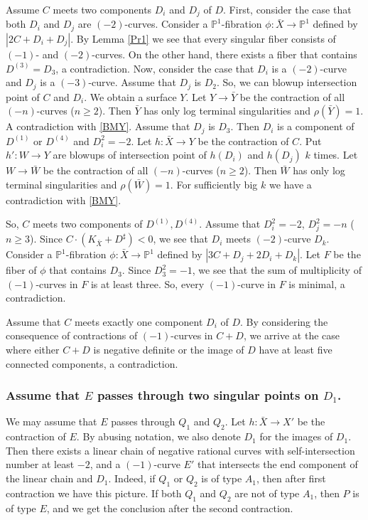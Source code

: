 \documentclass[10pt,oneside,reqno]{amsart}
\newcommand{\pp}{\mathbb{P}}
\theoremstyle{definition}
\theoremstyle{remark}
\numberwithin{equation}{section}
\begin{document}
Assume $C$ meets two components $D_i$ and $D_j$ of $D$. First, consider the case that both $D_i$ and $D_j$ are $(-2)$-curves. Consider a $\pp^1$-fibration $\phi\colon\bar{X}\rightarrow\pp^1$ defined by $|2C+D_i+D_j|$. By Lemma \ref{Pr1} we see that every singular fiber consists of $(-1)$- and $(-2)$-curves. On the other hand, there exists a fiber that contains $D^{(3)}=D_3$, a contradiction. Now, consider the case that $D_i$ is a $(-2)$-curve and $D_j$ is a $(-3)$-curve. Assume that $D_j$ is $D_2$. So, we can blowup intersection point of $C$ and $D_i$. We obtain a surface $Y$. Let $Y\rightarrow\bar{Y}$ be the contraction of all $(-n)$-curves ($n\geq 2$). Then $\bar{Y}$ has only log terminal singularities and $\rho(\bar{Y})=1$. A contradiction with \ref{BMY}. Assume that $D_j$ is $D_3$. Then $D_i$ is a component of $D^{(1)}$ or $D^{(4)}$ and $D_i^2=-2$. Let $h\colon\bar {X}\rightarrow Y$ be the contraction of $C$. Put $h'\colon W\rightarrow Y$ are blowups of intersection point of $h(D_i)$ and $h(D_j)$ $k$ times. Let $W\rightarrow\bar{W}$ be the contraction of all $(-n)$-curves ($n\geq 2$). Then $\bar{W}$ has only log terminal singularities and $\rho(\bar{W})=1$. For sufficiently big $k$ we have a contradiction with \ref{BMY}.



So, $C$ meets two components of $D^{(1)},D^{(4)}$. Assume that $D_i^2=-2$, $D_j^2=-n$ ($n\geq 3$). Since $C\cdot (K_{\bar{X}}+D^{\sharp})<0$, we see that $D_i$ meets $(-2)$-curve $D_k$.
Consider a $\pp^1$-fibration $\phi\colon\bar{X}\rightarrow\pp^1$ defined by $|3C+D_j+2D_i+D_k|$. Let $F$ be the fiber of $\phi$ that contains $D_3$. Since $D_3^2=-1$, we see that the sum of multiplicity of $(-1)$-curves in $F$ is at least three. So, every $(-1)$-curve in $F$ is minimal, a contradiction.

Assume that $C$ meets exactly one component $D_i$ of $D$. By considering the consequence of contractions of $(-1)$-curves in $C+D$, we arrive at the case where either $C+D$ is negative definite or the image of $D$ have at least five connected components, a contradiction.


\subsubsection{Assume that $E$ passes through two singular points on $D_1$.} We may assume that $E$ passes through $Q_1$ and $Q_2$. %
Let $h\colon\bar{X}\rightarrow X'$ be the contraction of $E$. By abusing notation, we also denote $D_1$  for the images of $D_1$. Then there exists a linear chain of negative rational curves with self-intersection number at least $-2$, and a $(-1)$-curve $E'$ that intersects the end component of the linear chain and $D_1$. Indeed, if $Q_1$ or $Q_2$ is of type $A_1$, then after first contraction we have this picture. If both $Q_1$ and $Q_2$ are not of type $A_1$, then $P$ is of type $E$, and we get the conclusion after the second contraction.
\end{document}
